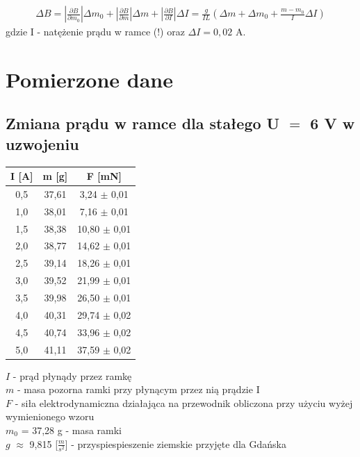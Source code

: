 \documentclass{article}
\begin{document}
\begin{gather*}
		\Delta B = |\frac{\partial B}{\partial m_0}|\Delta m_0 + |\frac{\partial B}{\partial m}|\Delta m + |\frac{\partial B}{\partial I}|\Delta I = \frac{g}{IL}(\Delta m + \Delta m_0 + \frac{m-m_0}{I}\Delta I)
\end{gather*}
gdzie I - natężenie prądu w ramce (!)  oraz $\Delta I = 0,02$ A.



\section{Pomierzone dane}

\subsection{Zmiana prądu w ramce dla stałego U $=$ 6 V  w uzwojeniu}
\begin{center}
\begin{tabular}{ c | c | c}
I [A] & m [g] & F [mN]\\
\hline
0,5 & 37,61  & 3,24 $\pm$ 0,01\\
1,0 & 38,01  & 7,16 $\pm$ 0,01\\
1,5 & 38,38  & 10,80 $\pm$ 0,01\\
2,0 & 38,77  & 14,62 $\pm$ 0,01\\
2,5 & 39,14  & 18,26 $\pm$ 0,01\\
3,0 & 39,52  & 21,99 $\pm$ 0,01\\
3,5 & 39,98  & 26,50 $\pm$ 0,01\\
4,0 & 40,31  & 29,74 $\pm$ 0,02\\
4,5 & 40,74  & 33,96 $\pm$ 0,02\\
5,0 & 41,11  & 37,59 $\pm$ 0,02\\
\end{tabular}
\end{center}
$I$ - prąd płynądy przez ramkę \\
$m$ - masa pozorna ramki przy płynącym przez nią prądzie I \\
$F$ - siła elektrodynamiczna działająca na przewodnik obliczona przy użyciu wyżej wymienionego wzoru\\
$m_0$ = 37,28 g - masa ramki \\
$g$ $\approx$ 9,815 [$\frac{m}{s^2}$] - przyspiespieszenie ziemskie przyjęte dla Gdańska
\end{document}
